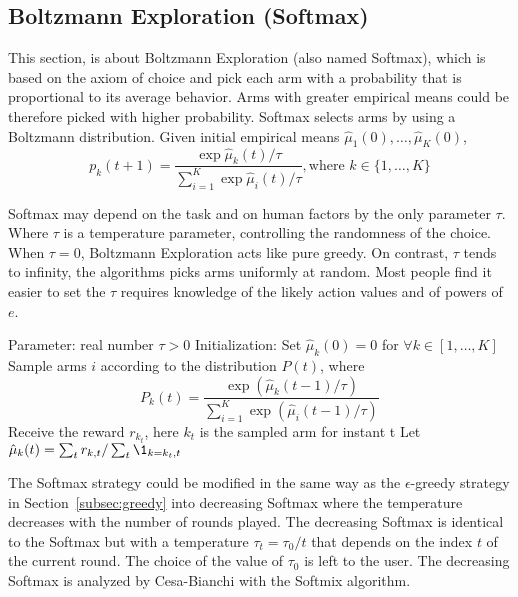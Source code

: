 \subsection{Boltzmann Exploration (Softmax)}
\label{subsec:softmax}
This section, is about  Boltzmann Exploration (also named  Softmax), which is based on the axiom of choice \cite{luce1959individual} and pick each arm with a probability that is proportional to its average  behavior. Arms with greater empirical means could be therefore picked with higher probability. Softmax  selects arms by using a Boltzmann distribution. Given initial empirical means $\hat{\mu}_1(0),\dots,\hat{\mu}_K(0)$,
\begin{equation}
\label{equa:boltzmann}
p_k(t+1) = \frac{\exp{\hat{\mu}_k(t)/\tau}}{\sum_{i=1}^{K}\exp{\hat{\mu}_i(t)/\tau}}, \text{where } k\in \{1,\dots,K\}
\end{equation}

Softmax may depend on the task and on human factors by the only parameter $\tau$. Where $\tau$ is a temperature parameter, controlling the randomness of the choice. When $\tau = 0$, Boltzmann Exploration acts like pure greedy. On contrast, $\tau$ tends to infinity, the algorithms picks arms uniformly at random. Most people find it easier to set the $\tau$ requires knowledge of the likely action values and of powers of $e$.

\begin{algo}[SoftMax]
\label{algo:softmax1}
\begin{algorithmic}
\STATE {\ }
\STATE Parameter: real number $\tau > 0$
\STATE Initialization: Set $\hat{\mu}_k(0) = 0$ for $\forall k \in [1,\dots,K]$
	\STATE Sample arms $i$ according to the distribution $P(t)$, where
    \[P_k(t) = \frac{\exp \left(\hat{\mu}_k(t-1)/\tau\right)}{\sum_{i=1}^{K} \exp \left(\hat{\mu}_i(t-1)/\tau\right)}\]
    \STATE Receive the reward $r_{k_t}$, here $k_t$ is the sampled arm for instant t 
    \STATE Let $\hat{\mu}_{k}(t) = \sum_t r_{k,t}/ \sum_t \1_{k = k_t,t}$
\ENDFOR
\end{algorithmic}
\end{algo}

The Softmax strategy could be modified in the same way as the $\epsilon$-greedy strategy in Section~\ref{subsec:greedy} into decreasing Softmax where the temperature decreases with the number of rounds played. The decreasing Softmax is identical to the Softmax but with a temperature $\tau_t = \tau_0/t$ that depends on the index $t$ of the current round. The choice of the value of $\tau_0$ is left to the user. The decreasing Softmax is analyzed by Cesa-Bianchi \cite{cesa1998finite} with the Softmix algorithm. 

